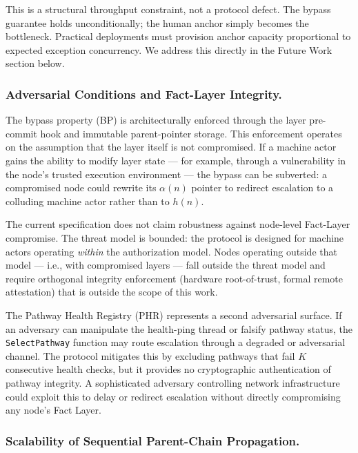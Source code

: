This is a structural throughput constraint, not a protocol defect. The bypass guarantee holds unconditionally; the human anchor simply becomes the bottleneck. Practical deployments must provision anchor capacity proportional to expected exception concurrency. We address this directly in the Future Work section below.

\subsubsection{Adversarial Conditions and Fact-Layer Integrity.}

The bypass property (BP) is architecturally enforced through the \fact{} layer pre-commit hook and immutable parent-pointer storage. This enforcement operates on the assumption that the \fact{} layer itself is not compromised. If a machine actor gains the ability to modify \fact{} layer state --- for example, through a vulnerability in the node's trusted execution environment --- the bypass can be subverted: a compromised node could rewrite its $\alpha(n)$ pointer to redirect escalation to a colluding machine actor rather than to $h(n)$.

The current specification does not claim robustness against node-level Fact-Layer compromise. The threat model is bounded: the protocol is designed for machine actors operating \emph{within} the \bxthree{} authorization model. Nodes operating outside that model --- i.e., with compromised \fact{} layers --- fall outside the threat model and require orthogonal integrity enforcement (hardware root-of-trust, formal remote attestation) that is outside the scope of this work.

The Pathway Health Registry (PHR) represents a second adversarial surface. If an adversary can manipulate the health-ping thread or falsify pathway status, the \texttt{SelectPathway} function may route escalation through a degraded or adversarial channel. The protocol mitigates this by excluding pathways that fail $K$ consecutive health checks, but it provides no cryptographic authentication of pathway integrity. A sophisticated adversary controlling network infrastructure could exploit this to delay or redirect escalation without directly compromising any node's Fact Layer.

\subsubsection{Scalability of Sequential Parent-Chain Propagation.}

